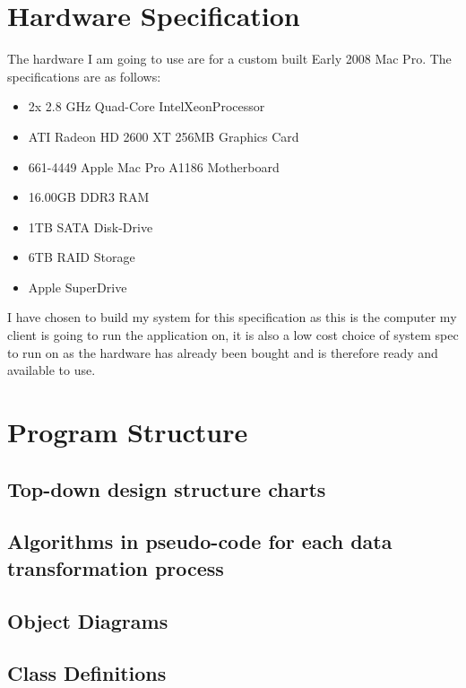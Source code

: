 \section{Hardware Specification}

The hardware I am going to use are for a custom built Early 2008 Mac Pro. The specifications are as follows:
\begin{itemize}
    \item 2x 2.8 GHz Quad-Core Intel\textregistered Xeon\texttrademark Processor
    \item ATI Radeon HD 2600 XT 256MB Graphics Card
    \item 661-4449 Apple Mac Pro A1186 Motherboard
    \item 16.00GB DDR3 RAM
    \item 1TB SATA Disk-Drive
    \item 6TB RAID Storage
    \item Apple SuperDrive \\
\end{itemize}

I have chosen to build my system for this specification as this is the computer my client is going to run the application on, it is also a low cost choice of system spec to run on as the hardware has already been bought and is therefore ready and available to use.

\section{Program Structure}

\subsection{Top-down design structure charts}

\subsection{Algorithms in pseudo-code for each data transformation process}

\subsection{Object Diagrams}

\subsection{Class Definitions}

